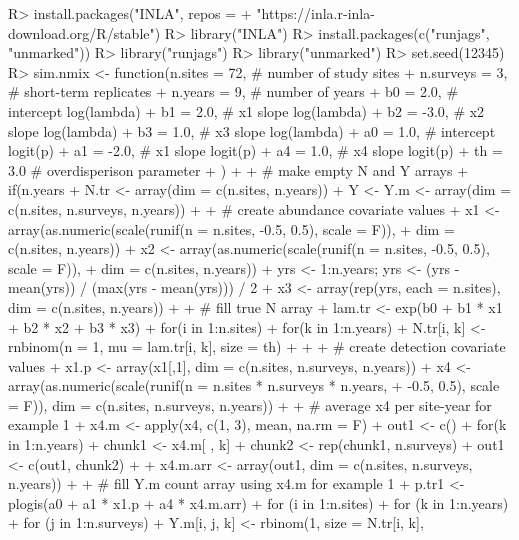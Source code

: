 \documentclass[codesnippet]{jss}
\begin{document}
\begin{CodeInput}
R> install.packages("INLA", repos = 
+    "https://inla.r-inla-download.org/R/stable")
R> library("INLA")
R> install.packages(c("runjags", "unmarked"))
R> library("runjags")
R> library("unmarked")
R> set.seed(12345)
R> sim.nmix <- function(n.sites = 72,    # number of study sites
+    n.surveys = 3,                      # short-term replicates
+    n.years = 9,                        # number of years
+    b0 = 2.0,                           # intercept log(lambda)
+    b1 = 2.0,                           # x1 slope log(lambda)
+    b2 = -3.0,                          # x2 slope log(lambda)
+    b3 = 1.0,                           # x3 slope log(lambda)
+    a0 = 1.0,                           # intercept logit(p)
+    a1 = -2.0,                          # x1 slope logit(p)
+    a4 = 1.0,                           # x4 slope logit(p)
+    th = 3.0                            # overdisperison parameter
+    ){
+
+    # make empty N and Y arrays
+    if(n.years %
+    N.tr <- array(dim = c(n.sites, n.years))
+    Y <- Y.m <- array(dim = c(n.sites, n.surveys, n.years))
+
+    # create abundance covariate values
+    x1 <- array(as.numeric(scale(runif(n = n.sites, -0.5, 0.5), scale = F)),
+      dim = c(n.sites, n.years))
+    x2 <- array(as.numeric(scale(runif(n = n.sites, -0.5, 0.5), scale = F)),
+      dim = c(n.sites, n.years))
+    yrs <- 1:n.years; yrs <- (yrs - mean(yrs)) / (max(yrs - mean(yrs))) / 2
+    x3 <- array(rep(yrs, each = n.sites), dim = c(n.sites, n.years))
+
+    # fill true N array
+    lam.tr <- exp(b0 + b1 * x1 + b2 * x2 + b3 * x3)
+    for(i in 1:n.sites){
+      for(k in 1:n.years){
+        N.tr[i, k] <- rnbinom(n = 1, mu = lam.tr[i, k], size = th)
+    }}
+
+    # create detection covariate values
+    x1.p <- array(x1[,1], dim = c(n.sites, n.surveys, n.years))
+    x4 <- array(as.numeric(scale(runif(n = n.sites * n.surveys * n.years,
+      -0.5, 0.5), scale = F)), dim = c(n.sites, n.surveys, n.years))
+
+    # average x4 per site-year for example 1
+    x4.m <- apply(x4, c(1, 3), mean, na.rm = F)
+    out1 <- c()
+    for(k in 1:n.years){
+      chunk1 <- x4.m[ , k]
+      chunk2 <- rep(chunk1, n.surveys)
+      out1 <- c(out1, chunk2)
+    }
+    x4.m.arr <- array(out1, dim = c(n.sites, n.surveys, n.years))
+
+    # fill Y.m count array using x4.m for example 1
+    p.tr1 <- plogis(a0 + a1 * x1.p + a4 * x4.m.arr)
+    for (i in 1:n.sites){
+      for (k in 1:n.years){
+        for (j in 1:n.surveys){
+          Y.m[i, j, k] <- rbinom(1, size = N.tr[i, k], 
}}}}
\end{CodeInput}
\end{document}
